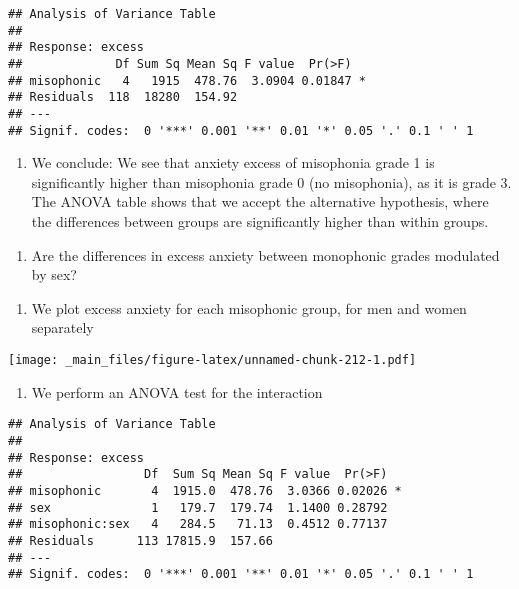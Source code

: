 \documentclass[
]{book}
\providecommand{\tightlist}{%
  \setlength{\itemsep}{0pt}\setlength{\parskip}{0pt}}
\begin{document}
\begin{verbatim}
## Analysis of Variance Table
## 
## Response: excess
##             Df Sum Sq Mean Sq F value  Pr(>F)  
## misophonic   4   1915  478.76  3.0904 0.01847 *
## Residuals  118  18280  154.92                  
## ---
## Signif. codes:  0 '***' 0.001 '**' 0.01 '*' 0.05 '.' 0.1 ' ' 1
\end{verbatim}

\begin{enumerate}
\def\labelenumi{\alph{enumi}.}
\setcounter{enumi}{2}
\tightlist
\item
  We conclude: We see that anxiety excess of misophonia grade 1 is significantly higher than misophonia grade 0 (no misophonia), as it is grade 3. The ANOVA table shows that we accept the alternative hypothesis, where the differences between groups are significantly higher than within groups.
\end{enumerate}

\begin{enumerate}
\def\labelenumi{\arabic{enumi}.}
\setcounter{enumi}{5}
\tightlist
\item
  Are the differences in excess anxiety between monophonic grades modulated by sex?
\end{enumerate}

\begin{enumerate}
\def\labelenumi{\alph{enumi}.}
\tightlist
\item
  We plot excess anxiety for each misophonic group, for men and women separately
\end{enumerate}

\texttt{[image: \_main\_files/figure-latex/unnamed-chunk-212-1.pdf]}

\begin{enumerate}
\def\labelenumi{\alph{enumi}.}
\setcounter{enumi}{1}
\tightlist
\item
  We perform an ANOVA test for the interaction
\end{enumerate}

\begin{verbatim}
## Analysis of Variance Table
## 
## Response: excess
##                 Df  Sum Sq Mean Sq F value  Pr(>F)  
## misophonic       4  1915.0  478.76  3.0366 0.02026 *
## sex              1   179.7  179.74  1.1400 0.28792  
## misophonic:sex   4   284.5   71.13  0.4512 0.77137  
## Residuals      113 17815.9  157.66                  
## ---
## Signif. codes:  0 '***' 0.001 '**' 0.01 '*' 0.05 '.' 0.1 ' ' 1
\end{verbatim}
\end{document}
